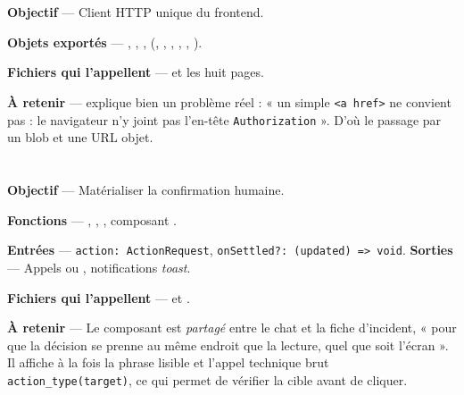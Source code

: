 \section{}

\textbf{Objectif} --- Client HTTP unique du frontend.

\textbf{Objets exportés} --- , ,
,  (, , ,
, , ).

\textbf{Fichiers qui l'appellent} ---  et les huit pages.

\textbf{À retenir} ---  explique bien un problème réel : « un
simple \texttt{<a href>} ne convient pas : le navigateur n'y joint pas
l'en-tête \texttt{Authorization} ». D'où le passage par un blob et une URL
objet.

\section{}

\textbf{Objectif} --- Matérialiser la confirmation humaine.

\textbf{Fonctions} --- , , ,
composant .

\textbf{Entrées} --- \texttt{action: ActionRequest},
\texttt{onSettled?: (updated) => void}.
\textbf{Sorties} --- Appels  ou
, notifications \emph{toast}.

\textbf{Fichiers qui l'appellent} ---  et .

\textbf{À retenir} --- Le composant est \emph{partagé} entre le chat et la fiche
d'incident, « pour que la décision se prenne au même endroit que la lecture,
quel que soit l'écran ». Il affiche à la fois la phrase lisible et l'appel
technique brut \texttt{action\_type(target)}, ce qui permet de vérifier la cible
avant de cliquer.

\section{}

